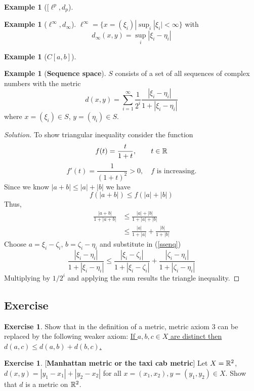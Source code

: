 \documentclass[	DIV=calc,paper=a4,fontsize=11pt]{scrartcl}	 	%
\theoremstyle{definition}
\newtheorem{exmp}[thm]{Example}
\newtheorem{exer}[thm]{Exercise}
\theoremstyle{plain}
\theoremstyle{remark}
\begin{document}
\begin{exmp}[\color{DarkGreen}\color{DarkGreen}[\textbf{$\ell^p,d_p$}]
\end{exmp}

\begin{exmp}[\color{DarkGreen}\textbf{$\ell^{\infty},d_{\infty}$}]
$\ell^{\infty}=\{x=(\xi_i)| \sup_i|\xi_i|<\infty\}$ with
\[d_{\infty}(x,y)=\sup_i|\xi_i-\eta_i|\]
\end{exmp}

\begin{exmp}[\color{DarkGreen}\textbf{$C[a,b]$}]
\end{exmp}

\begin{exmp}[\color{DarkGreen}\textbf{Sequence space}]
$S$ consists of a set of all sequences of complex numbers with the metric
\[d(x,y)=\sum_{i=1}^{\infty}\frac{1}{2^i}\frac{|\xi_i-\eta_i|}{1+|\xi_i-\eta_i|}\]
where $x=(\xi_i)\in S$, $y=(\eta_i)\in S$.
\end{exmp}
\begin{proof}[Solution] To show triangular inequality consider the function
\[f(t)=\frac{t}{1+t},\qquad t\in \Bbb R\]
\[f'(t)=\frac{1}{(1+t)^2}>0,\quad f \text{ is increasing.} \]
Since we know $|a+b|\le |a|+|b|$ we have
\[f(|a+b|)\le f(|a|+|b|)\]
Thus,
\begin{align}
\frac{|a+b|}{1+|a+b|} & \le \frac{|a|+|b|}{1+|a|+|b|}\\
                      & \le \frac{|a|}{1+|a|}+\frac{|b|}{1+|b|} \label{ssenq}
\end{align}
Choose $a=\xi_i-\zeta_i$, $b=\zeta_i-\eta_i$ and substitute in (\ref{ssenq})
\[\frac{|\xi_i-\eta_i|}{1+|\xi_i-\eta_i|} \le \frac{|\xi_i-\zeta_i|}{1+|\xi_i-\zeta_i|}+\frac{|\zeta_i-\eta_i|}{1+|\zeta_i-\eta_i|}\]
Multiplying by $1/2^i$ and applying the sum results the triangle inequality.
\end{proof}

\newpage
\subsection{Exercise}
\begin{exer}\label{010}
Show that in the definition of a metric, metric axiom 3 can be replaced by the following weaker axiom: \underline{If $a,b,c\in X$ are distinct then $d(a,c)\le d(a,b)+d(b,c)$.}
\end{exer}

\begin{exer}\label{011}[\textbf{Manhattan metric or the taxi cab metric}]
Let $X=\Bbb R^2$, $d(x,y)=|y_1-x_1|+|y_2-x_2|$ for all $x=(x_1,x_2),y=(y_1,y_2)\in X$. Show that $d$ is a metric on $\Bbb R^2$.
\end{exer}
\end{document}
